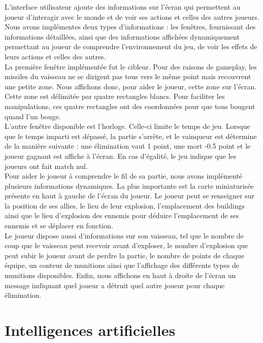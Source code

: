 \documentclass[12pt, titlepage]{article}
\begin{document}
\begin{spacing}{1.5}
L'interface utilisateur ajoute des informations sur l'écran qui permettent au joueur d'interagir avec le monde et de voir ses actions et celles des autres joueurs. Nous avons implémentes deux types d'informations : les fenêtres, fournissant des informations détaillées, ainsi que des informations affichées dynamiquement permettant au joueur de comprendre l'environnement du jeu, de voir les effets de leurs actions et celles des autres.\\

La première fenêtre implémentée fut le cibleur. Pour des raisons de gameplay, les missiles du vaisseau ne se dirigent pas tous vers le même point mais recouvrent une petite zone. Nous affichons donc, pour aider le joueur, cette zone sur l'écran. Cette zone est délimitée par quatre rectangles blancs. Pour faciliter les manipulations, ces quatre rectangles ont des coordonnées pour que tous bougent quand l'un bouge.\\

L'autre fenêtre disponible est l'horloge.  Celle-ci limite le temps de jeu. Lorsque que le temps imparti est dépassé, la partie s'arrête, et le vainqueur est détermine de la manière suivante : une élimination vaut 1 point, une mort -0.5 point et le joueur gagnant est affiche à l'écran. En cas d'égalité, le jeu indique que les joueurs ont fait match nul. \\

Pour aider le joueur à comprendre le fil de sa partie, nous avons implémenté plusieurs informations dynamiques. La plus importante est la carte miniaturisée présente en haut à gauche de l'écran du joueur. Le joueur peut se renseigner sur la position de ses allies, le lieu de leur explosion, l'emplacement des buildings ainsi que le lieu d'explosion des ennemis pour déduire l'emplacement de ses ennemis et se déplacer en fonction.\\

 Le joueur dispose aussi d'informations sur son vaisseau, tel que le nombre de coup que le vaisseau peut recevoir avant d'exploser, le nombre d'explosion que peut subir le joueur avant de perdre la partie, le nombre de points de chaque équipe, un conteur de munitions ainsi que l'affichage des différents types de munitions disponibles. Enfin, nous affichons en haut à droite de l'écran un message indiquant quel joueur a détruit quel autre joueur pour chaque élimination.\\

\newpage
\section{Intelligences artificielles}


\end{spacing}
\end{document}
